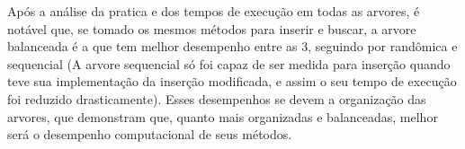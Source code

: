 \label{Conclusão}


Após a análise  da pratica e dos tempos de execução em todas as arvores, é notável que, se tomado os mesmos métodos para inserir e buscar, a arvore balanceada é a que tem melhor desempenho entre as 3, seguindo por randômica e sequencial (A arvore sequencial só foi capaz de ser medida para inserção quando teve sua implementação da inserção modificada, e assim o seu tempo de execução foi reduzido drasticamente). Esses desempenhos se devem a organização das arvores, que demonstram que, quanto mais organizadas e balanceadas, melhor será o desempenho computacional de seus métodos. 



